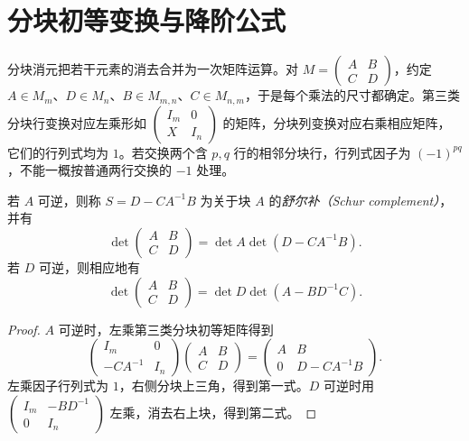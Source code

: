 \section{分块初等变换与降阶公式}
\label{sec:matrix-block-elimination}

分块消元把若干元素的消去合并为一次矩阵运算。对
$M=\begin{pmatrix}A&B\\C&D\end{pmatrix}$，约定 $A\in M_m$、$D\in M_n$、$B\in M_{m,n}$、$C\in M_{n,m}$，于是每个乘法的尺寸都确定。第三类分块行变换对应左乘形如 $\begin{pmatrix}I_m&0\\X&I_n\end{pmatrix}$ 的矩阵，分块列变换对应右乘相应矩阵，它们的行列式均为 $1$。若交换两个含 $p,q$ 行的相邻分块行，行列式因子为 $(-1)^{pq}$，不能一概按普通两行交换的 $-1$ 处理。

\begin{theorem}
\label{thm:matrix-schur-determinant}
若 $A$ 可逆，则称 $S=D-CA^{-1}B$ 为关于块 $A$ 的\emph{舒尔补（Schur complement）}，并有
\begin{equation}
 \det\begin{pmatrix}A&B\\C&D\end{pmatrix}
 =\det A\det(D-CA^{-1}B).
 \label{eq:matrix-schur-a}
\end{equation}
若 $D$ 可逆，则相应地有
\begin{equation}
 \det\begin{pmatrix}A&B\\C&D\end{pmatrix}
 =\det D\det(A-BD^{-1}C).
 \label{eq:matrix-schur-d}
\end{equation}
\end{theorem}
\begin{proof}
$A$ 可逆时，左乘第三类分块初等矩阵得到
\[
 \begin{pmatrix}I_m&0\\-CA^{-1}&I_n\end{pmatrix}
 \begin{pmatrix}A&B\\C&D\end{pmatrix}
 =\begin{pmatrix}A&B\\0&D-CA^{-1}B\end{pmatrix}.
\]
左乘因子行列式为 $1$，右侧分块上三角，得到第一式。$D$ 可逆时用 $\begin{pmatrix}I_m&-BD^{-1}\\0&I_n\end{pmatrix}$ 左乘，消去右上块，得到第二式。
\end{proof}

